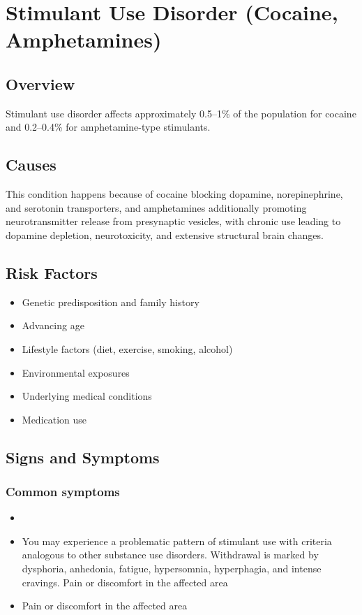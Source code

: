 \chapter{Stimulant Use Disorder (Cocaine, Amphetamines)}
\label{sec:Stimulant Use Disorder (Cocaine, Amphetamines)}

\section{Overview}
Stimulant use disorder affects approximately 0.5--1\% of the population for cocaine and 0.2--0.4\% for amphetamine-type stimulants.
\section{Causes}
This condition happens because of cocaine blocking dopamine, norepinephrine, and serotonin transporters, and amphetamines additionally promoting neurotransmitter release from presynaptic vesicles, with chronic use leading to dopamine depletion, neurotoxicity, and extensive structural brain changes.     
\section{Risk Factors}

\begin{itemize}[noitemsep]
  \item Genetic predisposition and family history
  \item Advancing age
  \item Lifestyle factors (diet, exercise, smoking, alcohol)
  \item Environmental exposures
  \item Underlying medical conditions
  \item Medication use
\end{itemize}
\section{Signs and Symptoms}

\subsection{Common symptoms}
\begin{itemize}[noitemsep]
  \item \item You may experience a problematic pattern of stimulant use with criteria analogous to other substance use disorders. Withdrawal is marked by dysphoria, anhedonia, fatigue, hypersomnia, hyperphagia, and intense cravings. Pain or discomfort in the affected area    \item Pain or discomfort in the affected area
  \end{itemize}

